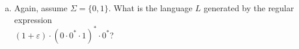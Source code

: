 \begin{enumerate}[(a)]
\item Again, assume $ \Sigma = \{0,1\} $. What is the language $ L $ generated by the regular expression 
      \\[0.2cm]
      \hspace*{1.3cm}
      $(1 + \varepsilon)\cdot(0\cdot 0^* \cdot 1)^* \cdot 0^*$? \eox

\end{enumerate}

